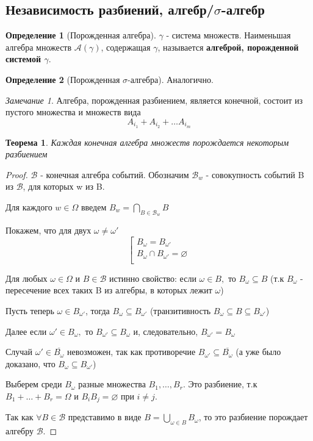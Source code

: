 \documentclass[a4paper]{article}
\newtheorem{theorem}{Теорема}[section]
\theoremstyle{definition}
\newtheorem*{definition}{Определение}
\theoremstyle{remark}
\newtheorem*{remark}{Замечание}
\begin{document}
\subsection{Независимость разбиений, алгебр/$\sigma$-алгебр}
\begin{definition}[Порожденная алгебра]
    $\gamma$ - система множеств. Наименьшая алгебра множеств $\mathscr{A}(\gamma)$, содержащая $\gamma$, называется \textbf{алгеброй, порожденной системой $\gamma$}.
\end{definition}
\begin{definition}[Порожденная $\sigma$-алгебра]
    Аналогично.
\end{definition}
\begin{remark}
    Алгебра, порожденная разбиением, является конечной, состоит из пустого множества и множеств вида
    \[A_{i_1} + A_{i_2}+ \dots A_{i_m}\]
\end{remark}
\begin{theorem}
    Каждая конечная алгебра множеств порождается некоторым разбиением
\end{theorem}
\begin{proof}
    $\mathscr{B}$ - конечная алгебра событий. Обозначим $\mathscr{B}_w$ - совокупность событий B из $\mathscr{B}$, для которых w из B.

    Для каждого $w \in \Omega$ введем $B_w = \bigcap_{B \in \mathscr{B}_w} B$

    Покажем, что для двух $\omega \neq \omega '$ 
        \[\left[
            \begin{gathered}
            B_{\omega} =  B_{\omega'}\\
            B_{\omega} \cap B_{\omega'} = \varnothing \\
        \end{gathered}
        \right.\]
    
    Для любых $\omega \in \Omega$ и $B \in \mathscr{B}$ истинно свойство: если $\omega \in B, $ то $B_\omega \subseteq B$ (т.к $B_\omega$ - пересечение всех таких B из алгебры, в которых лежит $\omega$)

    Пусть теперь $\omega \in B_{\omega'}$, тогда $B_\omega \subseteq B_{\omega '}$ (транзитивность $B_\omega \subseteq B \subseteq B_{\omega'}$) 
    
    Далее если $\omega' \in B_\omega, $ то $B_{\omega'} \subseteq B_{\omega}$ и, следовательно, $B_{\omega'} = B_{\omega}$

    Случай $\omega'\in \overline{B_{\omega}}$ невозможен, так как противоречие $B_{\omega'} \subseteq \overline{B_\omega}$ (а уже было доказано, что $B_\omega \subseteq B_{\omega '}$)

    Выберем среди $B_\omega$ разные множества $B_1, \dots, B_r$. Это разбиение, т.к $B_1 + \dots + B_r = \Omega$ и $B_i B_j = \varnothing$ при $i\neq j$.

    Так как $\forall B \in \mathscr{B}$ представимо в виде $B = \bigcup_{\omega \in B} B_\omega$, то это разбиение порождает алгебру $\mathscr{B}$.

\end{proof}
\end{document}
